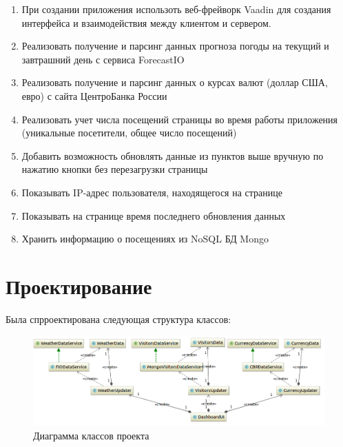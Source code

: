 \documentclass{article}
\begin{document}
\begin{enumerate}

\item При создании приложения использоть веб-фрейворк Vaadin для создания интерфейса и взаимодействия между клиентом и сервером.
\item Реализовать получение и парсинг данных прогноза погоды на текущий и завтрашний день с сервиса ForecastIO
\item Реализовать получение и парсинг данных о курсах валют (доллар США, евро) с сайта ЦентроБанка России
\item Реализовать учет числа посещений страницы во время работы приложения (уникальные посетители, общее число посещений)
\item Добавить возможность обновлять данные из пунктов выше вручную по нажатию кнопки без перезагрузки страницы
\item Показывать IP-адрес пользователя, находящегося на странице
\item Показывать на странице время последнего обновления данных
\item Хранить информацию о посещениях из NoSQL БД Mongo

\end{enumerate}

\section{Проектирование}
\doublespacing

Была спрроектирована следующая структура классов:

\begin{figure}[h]
\centering
\includegraphics[width=\textwidth]{uml}
\caption{Диаграмма классов проекта}
\end{figure}
\end{document}
